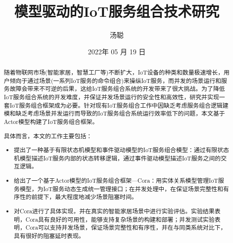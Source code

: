 \documentclass[winfonts,master,twoside]{njuthesis}
\title{模型驱动的IoT服务组合技术研究}
\author{汤聪}
\institute{南京大学}
\date{2022年 05 月 19 日}
\begin{document}

\maketitle
\makeenglishtitle


\frontmatter

\begin{abstract}

随着物联网市场(智能家居，智慧工厂等)不断扩大，IoT设备的种类和数量极速增长，用户倾向于通过场景(一系列IoT服务的命令组合)来操纵IoT服务，而并发的场景运行和服务故障会带来不可逆的后果，这给IoT服务组合系统的开发带来了很大挑战。为了降低IoT服务组合系统的开发难度，并保证并发场景运行的安全性和高效性，研究并实现一套IoT服务组合框架成为必要。针对现有IoT服务组合工作中因缺乏考虑服务组合逻辑建模和缺乏考虑场景并发运行而导致的IoT服务组合系统运行效率低下的问题，本文基于Actor模型构建了IoT服务组合框架。

具体而言，本文的工作主要包括：

\begin{itemize}
    \item 提出了一种基于有限状态机模型和事件驱动模型的IoT服务组合模型：通过有限状态机模型描述IoT服务内部的状态转移逻辑，通过事件驱动模型描述IoT服务之间的交互逻辑。
    \item 给出了一个基于Actor模型的IoT服务组合框架—Cora：用实体关系模型管理IoT服务模型，为IoT服务动态生成统一管理接口；在并发处理中，在保证场景完整性和有序性的前提下，最大程度地减少场景阻塞时间。
    \item 对Cora进行了具体实现，并在真实的智能家居场景中进行实验评估。实验结果表明，Cora具有良好的可用性，能够支持复杂场景的构建和部署；并发测试实验表明，Cora可以支持并发场景，保证场景完整性和有序性，并在与同类系统对比下，具有很好的阻塞延时表现。
\end{itemize}

\end{abstract}
\end{document}
